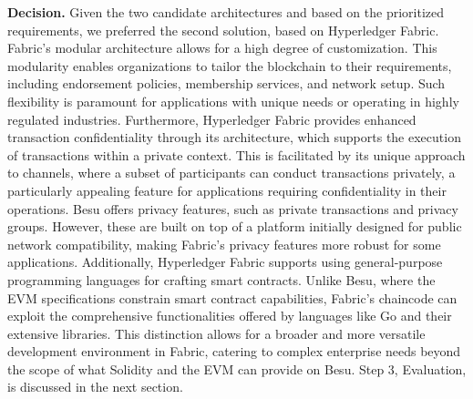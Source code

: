 


\noindent\textbf{Decision.} Given the two candidate architectures and based on the prioritized requirements, we preferred the second solution, based on Hyperledger Fabric. Fabric's modular architecture allows for a high degree of customization. This modularity enables organizations to tailor the blockchain to their requirements, including endorsement policies, membership services, and network setup. Such flexibility is paramount for applications with unique needs or operating in highly regulated industries.
Furthermore, Hyperledger Fabric provides enhanced transaction confidentiality through its architecture, which supports the execution of transactions within a private context. This is facilitated by its unique approach to channels, where a subset of participants can conduct transactions privately, a particularly appealing feature for applications requiring confidentiality in their operations. Besu offers privacy features, such as private transactions and privacy groups. However, these are built on top of a platform initially designed for public network compatibility, making Fabric's privacy features more robust for some applications.
Additionally, Hyperledger Fabric supports using general-purpose programming languages for crafting smart contracts. Unlike Besu, where the EVM specifications constrain smart contract capabilities, Fabric's chaincode can exploit the comprehensive functionalities offered by languages like Go and their extensive libraries. This distinction allows for a broader and more versatile development environment in Fabric, catering to complex enterprise needs beyond the scope of what Solidity and the EVM can provide on Besu. Step 3, Evaluation, is discussed in the next section.
